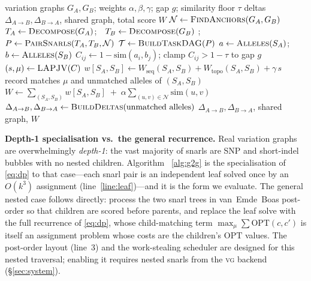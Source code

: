 \documentclass[conference]{IEEEtran}
\theoremstyle{plain}
\theoremstyle{definition}
\begin{document}
\begin{algorithm}[t]
\caption{\textsc{G2G} graph-to-graph alignment (depth-1 form; the general nested
case is obtained by replacing line~\ref{line:leaf} with the recurrence of
\eqref{eq:dp}---see text).}
\label{alg:g2g}
\begin{algorithmic}[1]
\Require variation graphs $G_A,G_B$; weights $\alpha,\beta,\gamma$; gap $g$;
         similarity floor $\tau$
\Ensure deltas $\Delta_{A\to B},\Delta_{B\to A}$, shared graph, total score $W$
\State $\mathcal{N}\gets \Call{FindAnchors}{G_A,G_B}$ 
\State $T_A\gets\Call{Decompose}{G_A}$;\ \ $T_B\gets\Call{Decompose}{G_B}$
\State {};\ \ 
\State $P\gets\Call{PairSnarls}{T_A,T_B,\mathcal{N}}$
\State $\mathcal{T}\gets\Call{BuildTaskDAG}{P}$
   \State $a\gets\Call{Alleles}{S_A}$;\ \ $b\gets\Call{Alleles}{S_B}$
   \State $C_{ij}\gets 1-\mathrm{sim}(a_i,b_j)$; clamp $C_{ij}\!>\!1{-}\tau$ to gap $g$
   \State $(s,\mu)\gets\Call{LAPJV}{C}$ \label{line:leaf}
   \State $w[S_A,S_B]\gets W_{\text{seq}}(S_A,S_B)+W_{\text{topo}}(S_A,S_B)+\gamma\,s$
   \State record matches $\mu$ and unmatched alleles of $(S_A,S_B)$
\EndParFor
\State $W\gets\!\!\sum_{(S_A,S_B)}\!\! w[S_A,S_B]\;+\;\alpha\!\!\sum_{(u,v)\in\mathcal N}\!\!\mathrm{sim}(u,v)$
\State $\Delta_{A\to B},\Delta_{B\to A}\gets\Call{BuildDeltas}{\text{unmatched alleles}}$
\State \Return $\Delta_{A\to B},\Delta_{B\to A}$, shared graph, $W$
\end{algorithmic}
\end{algorithm}

\noindent\textbf{Depth-1 specialisation vs.\ the general recurrence.}
Real variation graphs are overwhelmingly \emph{depth-1}: the vast majority of
snarls are SNP and short-indel bubbles with no nested children. Algorithm~%
\ref{alg:g2g} is the specialisation of \eqref{eq:dp} to that case---each snarl
pair is an independent leaf solved once by an $O(k^3)$ assignment
(line~\ref{line:leaf})---and it is the form we evaluate. The general nested case
follows directly: process the two snarl trees in van~Emde~Boas post-order so that
children are scored before parents, and replace the leaf solve with the full
recurrence of \eqref{eq:dp}, whose child-matching term $\max_\mu\sum
\mathrm{OPT}(c,c')$ is itself an assignment problem whose costs are the children's
$\mathrm{OPT}$ values. The post-order layout (line~3) and the
work-stealing scheduler are designed for this nested traversal; enabling it
requires nested snarls from the \textsc{vg} backend (\S\ref{sec:system}).
\end{document}
